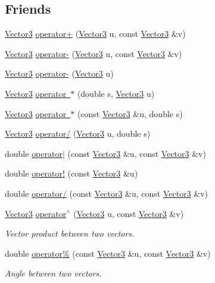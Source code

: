 \subsection*{Friends}
\begin{DoxyCompactItemize}
\item 
\mbox{\hyperlink{class_vector3}{Vector3}} \mbox{\hyperlink{class_vector3_a09b6fd43617473072319da125cc1ece8}{operator+}} (\mbox{\hyperlink{class_vector3}{Vector3}} u, const \mbox{\hyperlink{class_vector3}{Vector3}} \&v)
\item 
\mbox{\hyperlink{class_vector3}{Vector3}} \mbox{\hyperlink{class_vector3_ad504438b7c6757ab73c48013919f8333}{operator-\/}} (\mbox{\hyperlink{class_vector3}{Vector3}} u, const \mbox{\hyperlink{class_vector3}{Vector3}} \&v)
\item 
\mbox{\hyperlink{class_vector3}{Vector3}} \mbox{\hyperlink{class_vector3_a0e55d4adeebd39752a52dff8a1062bec}{operator-\/}} (\mbox{\hyperlink{class_vector3}{Vector3}} u)
\item 
\mbox{\hyperlink{class_vector3}{Vector3}} \mbox{\hyperlink{class_vector3_acfbed74a82515171cc077011a2512bbe}{operator $\ast$}} (double s, \mbox{\hyperlink{class_vector3}{Vector3}} u)
\item 
\mbox{\hyperlink{class_vector3}{Vector3}} \mbox{\hyperlink{class_vector3_a5b45d6f5e835014c7e2636791bf18da2}{operator $\ast$}} (const \mbox{\hyperlink{class_vector3}{Vector3}} \&u, double s)
\item 
\mbox{\hyperlink{class_vector3}{Vector3}} \mbox{\hyperlink{class_vector3_a9059e0264f23e1c78d195b095559cb79}{operator/}} (\mbox{\hyperlink{class_vector3}{Vector3}} u, double s)
\item 
double \mbox{\hyperlink{class_vector3_ac0d7df6bee7a105ace4ec138bff8a262}{operator$\vert$}} (const \mbox{\hyperlink{class_vector3}{Vector3}} \&u, const \mbox{\hyperlink{class_vector3}{Vector3}} \&v)
\item 
double \mbox{\hyperlink{class_vector3_ae2d5ffacf6098c4c2883e54131fa70c2}{operator!}} (const \mbox{\hyperlink{class_vector3}{Vector3}} \&u)
\item 
double \mbox{\hyperlink{class_vector3_a87668fe6d96f1826fb2721883d194ad3}{operator/}} (const \mbox{\hyperlink{class_vector3}{Vector3}} \&u, const \mbox{\hyperlink{class_vector3}{Vector3}} \&v)
\item 
\mbox{\hyperlink{class_vector3}{Vector3}} \mbox{\hyperlink{class_vector3_adb4922062355e087babc81e8d5b7c05f}{operator$^\wedge$}} (\mbox{\hyperlink{class_vector3}{Vector3}} u, const \mbox{\hyperlink{class_vector3}{Vector3}} \&v)
\begin{DoxyCompactList}\small\item\em Vector product between two vectors. \end{DoxyCompactList}\item 
double \mbox{\hyperlink{class_vector3_ab7427dc980f710e550fb4de32f0dfcbb}{operator\%}} (const \mbox{\hyperlink{class_vector3}{Vector3}} \&u, const \mbox{\hyperlink{class_vector3}{Vector3}} \&v)
\begin{DoxyCompactList}\small\item\em Angle between two vectors. \end{DoxyCompactList}\end{DoxyCompactItemize}
